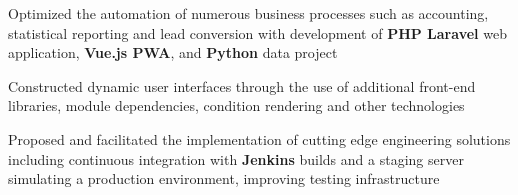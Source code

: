 \documentclass[letterpaper]{deedy-resume} %
\begin{document}
\begin{minipage}[t]{0.66\textwidth}
\begin{tightitemize}
\end{tightitemize}
\sectionspace

\vspace{5pt}

\begin{tightitemize}

\item Optimized the automation of numerous business processes such as accounting,
statistical reporting and lead conversion with development of \textbf{PHP Laravel} web
application, \textbf{Vue.js PWA}, and \textbf{Python} data project

\item Constructed dynamic user interfaces through the use of additional front-end libraries, module dependencies, condition rendering and other technologies

\item Proposed and facilitated the implementation of cutting edge engineering
solutions including continuous integration with \textbf{Jenkins} builds and a staging
server simulating a production environment, improving testing infrastructure


\end{tightitemize}
\sectionspace



\end{minipage}
\end{document}
